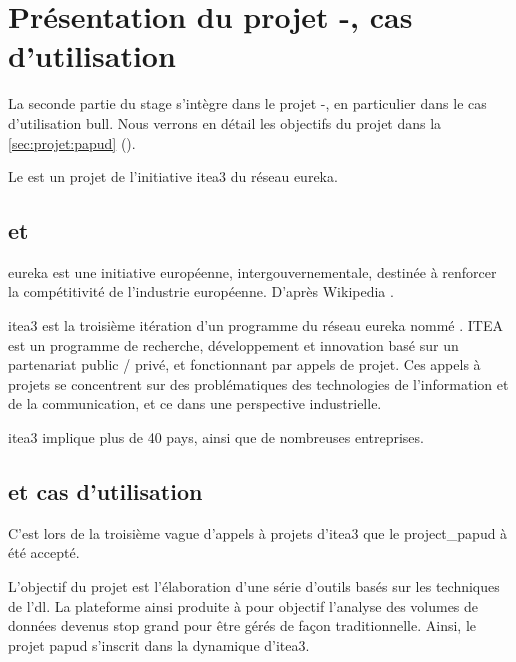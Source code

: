 %
%

\section{Présentation du projet -, cas d'utilisation }
La seconde partie du stage s'intègre dans le projet -, en particulier dans le cas d'utilisation \gls{bull}. Nous verrons en détail les objectifs du projet dans la \autoref{sec:projet:papud} ().

Le  est un projet de l'initiative \gls{itea3} du réseau \gls{eureka}.

\newpage
\subsection{ et }
\og\gls{eureka} est une initiative européenne, intergouvernementale, destinée à renforcer la compétitivité de l’industrie européenne.\fg{} D'après Wikipedia .

\gls{itea3} est la troisième itération d'un programme du réseau \gls{eureka} nommé .
ITEA est un programme de recherche, développement et innovation basé sur un partenariat public / privé, et fonctionnant par appels de projet.
Ces appels à projets se concentrent sur des problématiques des technologies de l'information et de la communication, et ce dans une perspective industrielle.

\gls{itea3} implique plus de 40 pays, ainsi que de nombreuses entreprises.


\subsection{ et cas d'utilisation }
C'est lors de la troisième vague d'appels à projets d'\gls{itea3} que le  \gls{project_papud} à été accepté.

L'objectif du projet  est l'élaboration d'une série d'outils basés sur les techniques de l'\gls{dl}.
La plateforme ainsi produite à pour objectif l'analyse des volumes de données devenus stop grand pour être gérés de façon traditionnelle.
Ainsi, le projet \gls{papud} s'inscrit dans la dynamique d'\gls{itea3}.

